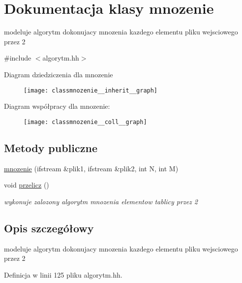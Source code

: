 \hypertarget{classmnozenie}{\section{\-Dokumentacja klasy mnozenie}
\label{classmnozenie}
}


modeluje algorytm dokonujacy mnozenia kazdego elementu pliku wejsciowego przez 2  




{\ttfamily \#include $<$algorytm.\-hh$>$}



\-Diagram dziedziczenia dla mnozenie\nopagebreak
\begin{figure}[H]
\begin{center}
\leavevmode
\texttt{[image: classmnozenie\_\_inherit\_\_graph]}
\end{center}
\end{figure}


\-Diagram współpracy dla mnozenie\-:\nopagebreak
\begin{figure}[H]
\begin{center}
\leavevmode
\texttt{[image: classmnozenie\_\_coll\_\_graph]}
\end{center}
\end{figure}
\subsection*{\-Metody publiczne}
\begin{DoxyCompactItemize}
\item 
\hyperlink{classmnozenie_a105c483d60c621dc5c1855a04e285e3c}{mnozenie} (ifstream \&plik1, ifstream \&plik2, int \-N, int \-M)
\item 
void \hyperlink{classmnozenie_a5c97c36f9463bdf4eb7e34976a029930}{przelicz} ()
\begin{DoxyCompactList}\small\item\em wykonuje zalozony algorytm mnozenia elementow tablicy przez 2 \end{DoxyCompactList}\end{DoxyCompactItemize}


\subsection{\-Opis szczegółowy}
modeluje algorytm dokonujacy mnozenia kazdego elementu pliku wejsciowego przez 2 

\-Definicja w linii 125 pliku algorytm.\-hh.



